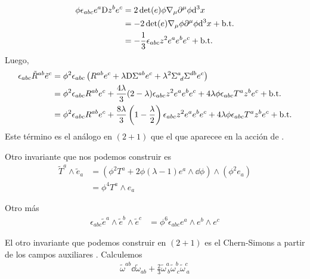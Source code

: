 \begin{align}
  \phi\epsilon_{abc} e^{a}\mathrm{D} z^be^c&=2\det(e)\phi\nabla_\mu\partial^\mu \phi\dd^3x\\
  &=-2\det(e)\nabla_\mu\phi\partial^\mu\phi \dd^3x+\rm b.t.\\
 &=-\frac{1}{3}\epsilon_{abc} z^2e^{a}e^be^c+\rm b.t.
\end{align}
Luego,
\begin{align}
  \epsilon_{abc}\tilde{R}^{ab} \tilde{e}^c&=\phi^2\epsilon_{abc}\left(R^{ab} e^c+\lambda \mathrm{D} \Sigma^{ab} e^c+\lambda^2 \Sigma^{a}_{~d} \Sigma^{db} e^c\right)\\
  &=\phi^2\epsilon_{abc} R^{ab}e^c+\frac{4\lambda}{3}(2-\lambda)\epsilon_{abc} z^2e^{a}e^be^c+4\lambda \phi\epsilon_{abc} T^{a}z^be^c + \rm b.t.\\
  &=\phi^2\epsilon_{abc} R^{ab}e^c+\frac{8\lambda}{3}\left(1-\frac{\lambda}{2}\right)\epsilon_{abc} z^2e^{a}e^be^c+4\lambda \phi\epsilon_{abc} T^{a}z^be^c + \rm b.t.
\end{align}
Este término es el análogo en $(2+1)$ que el que aparecee en la acción de \cite{Aviles:2024muk}.




















Otro invariante que nos podemos construir es
\begin{align}
  \tilde{T}^{a}\wedge\tilde{e}_a&=\left(\phi^2T^{a}+2\phi (\lambda-1)e^{a}\wedge\dd\phi\right)\wedge \left(\phi^2 e_{a}\right)\\
  &=\phi^4 T^{a}\wedge e_a
\end{align}

Otro más
\begin{align}
  \epsilon_{abc}\tilde{e}^{a}\wedge \tilde{e}^b\wedge \tilde{e}^c&=\phi^6\epsilon_{abc}e^{a}\wedge e^b\wedge e^c
\end{align}

El otro invariante que podemos construir en $(2+1)$ es el Chern-Simons a partir de los campos auxiliares . Calculemos
\begin{align}\label{CS}
  \tilde{\omega}^{ab}\dd\tilde{\omega}_{ab}+\frac{2}{3}\tilde{\omega}^{a}_{~b}\tilde{\omega}^{b}_{~c}\tilde{\omega}^{c}_{~a}
\end{align}

